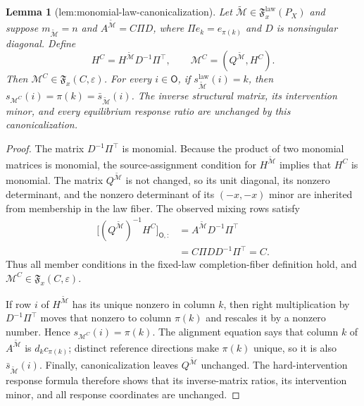 \documentclass{article}
\newtheorem{lemma}{Lemma}
\begin{document}
\begin{lemma}[lem:monomial-law-canonicalization]\label{lem:monomial-law-canonicalization}
Let \(\widetilde{\mathcal M}\in\mathfrak F_x^{\mathrm{law}}(P_X)\) and suppose \(m_{\widetilde{\mathcal M}}=n\) and \(A^{\widetilde{\mathcal M}}=C\Pi D\), where \(\Pi e_k=e_{\pi(k)}\) and \(D\) is nonsingular diagonal. Define
\[
 H^C=H^{\widetilde{\mathcal M}}D^{-1}\Pi^\top,
 \qquad
 \mathcal M^C=(Q^{\widetilde{\mathcal M}},H^C).
\]
Then \(\mathcal M^C\in\mathfrak F_x(C,\varepsilon)\). For every \(i\in\mathsf O\), if \(s_{\widetilde{\mathcal M}}^{\mathrm{law}}(i)=k\), then \(s_{\mathcal M^C}(i)=\pi(k)=\bar s_{\widetilde{\mathcal M}}(i)\). The inverse structural matrix, its intervention minor, and every equilibrium response ratio are unchanged by this canonicalization.
\end{lemma}
\begin{proof}
The matrix \(D^{-1}\Pi^\top\) is monomial. Because the product of two monomial matrices is monomial, the source-assignment condition for \(H^{\widetilde{\mathcal M}}\) implies that \(H^C\) is monomial. The matrix \(Q^{\widetilde{\mathcal M}}\) is not changed, so its unit diagonal, its nonzero determinant, and the nonzero determinant of its \((-x,-x)\) minor are inherited from membership in the law fiber. The observed mixing rows satisfy
\[
 \begin{aligned}
 \bigl[(Q^{\widetilde{\mathcal M}})^{-1}H^C\bigr]_{\mathsf O,:}
 &=A^{\widetilde{\mathcal M}}D^{-1}\Pi^\top\\
 &=C\Pi DD^{-1}\Pi^\top=C. \tag{8}
 \end{aligned}
\]
Thus all member conditions in the fixed-law completion-fiber definition hold, and \(\mathcal M^C\in\mathfrak F_x(C,\varepsilon)\).

If row \(i\) of \(H^{\widetilde{\mathcal M}}\) has its unique nonzero in column \(k\), then right multiplication by \(D^{-1}\Pi^\top\) moves that nonzero to column \(\pi(k)\) and rescales it by a nonzero number. Hence \(s_{\mathcal M^C}(i)=\pi(k)\). The alignment equation says that column \(k\) of \(A^{\widetilde{\mathcal M}}\) is \(d_kc_{\pi(k)}\); distinct reference directions make \(\pi(k)\) unique, so it is also \(\bar s_{\widetilde{\mathcal M}}(i)\). Finally, canonicalization leaves \(Q^{\widetilde{\mathcal M}}\) unchanged. The hard-intervention response formula therefore shows that its inverse-matrix ratios, its intervention minor, and all response coordinates are unchanged.
\end{proof}
\end{document}
